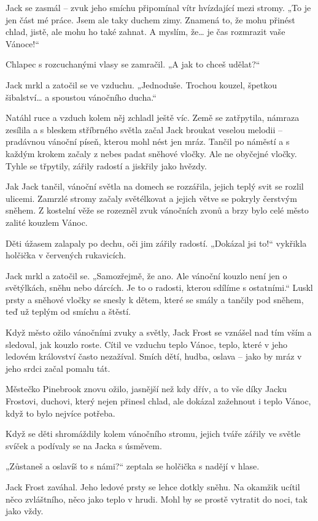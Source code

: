 \documentclass{article}
\begin{document}
Jack se zasmál – zvuk jeho smíchu připomínal vítr hvízdající mezi stromy. „To je jen část mé práce. Jsem ale taky duchem zimy. Znamená to, že mohu přinést chlad, jistě, ale mohu ho také zahnat. A myslím, že… je čas rozmrazit vaše Vánoce!“

Chlapec s rozcuchanými vlasy se zamračil. „A jak to chceš udělat?“

Jack mrkl a zatočil se ve vzduchu. „Jednoduše. Trochou kouzel, špetkou šibalství… a spoustou vánočního ducha.“

Natáhl ruce a vzduch kolem něj zchladl ještě víc. Země se zatřpytila, námraza zesílila a s bleskem stříbrného světla začal Jack broukat veselou melodii – pradávnou vánoční píseň, kterou mohl nést jen mráz. Tančil po náměstí a s každým krokem začaly z nebes padat sněhové vločky. Ale ne obyčejné vločky. Tyhle se třpytily, zářily radostí a jiskřily jako hvězdy.

Jak Jack tančil, vánoční světla na domech se rozzářila, jejich teplý svit se rozlil ulicemi. Zamrzlé stromy začaly světélkovat a jejich větve se pokryly čerstvým sněhem. Z kostelní věže se rozezněl zvuk vánočních zvonů a brzy bylo celé město zalité kouzlem Vánoc.

Děti úžasem zalapaly po dechu, oči jim zářily radostí. „Dokázal jsi to!“ vykřikla holčička v červených rukavicích.

Jack mrkl a zatočil se. „Samozřejmě, že ano. Ale vánoční kouzlo není jen o světýlkách, sněhu nebo dárcích. Je to o radosti, kterou sdílíme s ostatními.“ Luskl prsty a sněhové vločky se snesly k dětem, které se smály a tančily pod sněhem, teď už teplým od smíchu a štěstí.

Když město ožilo vánočními zvuky a světly, Jack Frost se vznášel nad tím vším a sledoval, jak kouzlo roste. Cítil ve vzduchu teplo Vánoc, teplo, které v jeho ledovém království často nezažíval. Smích dětí, hudba, oslava – jako by mráz v jeho srdci začal pomalu tát.

Městečko Pinebrook znovu ožilo, jasnější než kdy dřív, a to vše díky Jacku Frostovi, duchovi, který nejen přinesl chlad, ale dokázal zažehnout i teplo Vánoc, když to bylo nejvíce potřeba.

Když se děti shromáždily kolem vánočního stromu, jejich tváře zářily ve světle svíček a podívaly se na Jacka s úsměvem.

„Zůstaneš a oslavíš to s námi?“ zeptala se holčička s nadějí v hlase.

Jack Frost zaváhal. Jeho ledové prsty se lehce dotkly sněhu. Na okamžik ucítil něco zvláštního, něco jako teplo v hrudi. Mohl by se prostě vytratit do noci, tak jako vždy.
\end{document}
